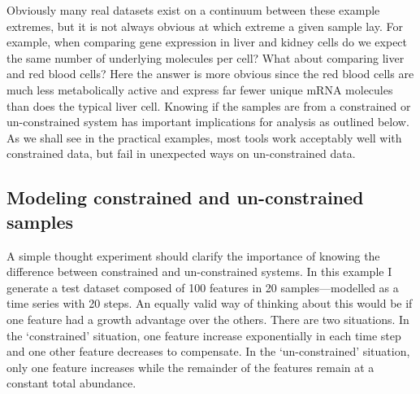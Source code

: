 \documentclass[onecolumn]{article}
\begin{document}
Obviously many real datasets exist on a continuum between these example extremes, but it is not always obvious at which extreme a given sample lay. For example, when comparing gene expression in liver and kidney cells do we expect the same number of underlying molecules per cell? What about comparing liver and red blood cells? Here the answer is more obvious since the red blood cells are much less metabolically active and express far fewer unique mRNA molecules than does the typical liver cell. Knowing if the samples are from a constrained or un-constrained system has important implications for analysis as outlined below. As we shall see in the practical examples, most tools work acceptably well with constrained data, but fail in unexpected ways on un-constrained data.

\hypertarget{modeling-constrained-and-un-constrained-samples}{%
\subsection{Modeling constrained and un-constrained samples}\label{modeling-constrained-and-un-constrained-samples}}

A simple thought experiment should clarify the importance of knowing the difference between constrained and un-constrained systems. In this example I generate a test dataset composed of 100 features in 20 samples---modelled as a time series with 20 steps. An equally valid way of thinking about this would be if one feature had a growth advantage over the others. There are two situations. In the `constrained' situation, one feature increase exponentially in each time step and one other feature decreases to compensate. In the `un-constrained' situation, only one feature increases while the remainder of the features remain at a constant total abundance.
\end{document}
